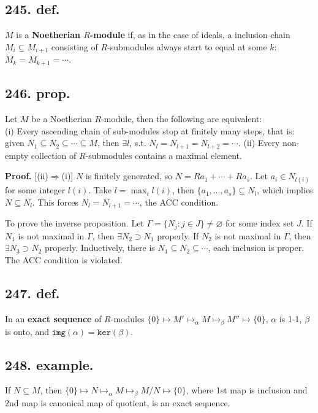 \documentclass[12pt]{article}
\newcommand\aG\alpha \newcommand\bG\beta  \newcommand\gG\gamma \newcommand\dG\delta \newcommand\eG\varepsilon \newcommand\zG\zeta \newcommand\tG\vartheta \newcommand\kG\kappa \newcommand\lG\lambda \newcommand\sG\sigma \newcommand\fG\varphi \newcommand\oG\omega
\newcommand\GG\varGamma \newcommand\DG\varDelta \newcommand\TG\Theta \newcommand\LG\varLambda \newcommand\SG\varSigma \newcommand\FG\varPhi \newcommand\YG\varUpsilon \newcommand\OG\varOmega
\newcommand{\Ex}\exists%
\newcommand{\Mp}\mapsto%
\newcommand{\Ip}{\Rightarrow} %
\newcommand{\Ss}[1]{\textsf{\bfseries{#1}}}%
\newcommand{\Tw}[1]{\texttt{#1}}%
\begin{document}
\subsection*{245. def.} \(M\) is a \Ss{Noetherian \(R\)-module} if, as in the case of ideals, a inclusion chain \(M_i \subseteq M_{i+1}\) consisting of \(R\)-submodules always start to equal at some \(k\): \(M_k =M_{k+1} =\dotsb\). 

\subsection*{246. prop.} Let \(M\) be a Noetherian \(R\)-module, then the following are equivalent: \\
\indent (i) Every ascending chain of sub-modules stop at finitely many steps, that is: given \(N_1 \subseteq N_2 \subseteq\dotsb\subseteq M\), then \(\Ex l\), s.t. \(N_l =N_{l+1} =N_{l+2}=\dotsb\). 
(ii) Every non-empty collection of \(R\)-submodules contains a maximal element. \par
\Ss{Proof.} [(ii)\(\Ip\)(i)] \(N\) is finitely generated, so \(N =Ra_1 +\dotsb+ Ra_s\). 
Let \(a_i \in N_{l(i)}\) for some integer \(l(i)\). 
Take \(l =\max_i l(i)\), then \(\{a_1,\dotsc,a_s\} \subseteq N_l\), which implies \(N \subseteq N_l\). 
This forces \(N_l =N_{l+1} =\dotsb\), the ACC condition. \par
[(i)\(\Ip\)(ii)] To prove the inverse proposition. 
Let \(\GG =\{N_j: j\in J\} \neq \varnothing\) for some index set \(J\). 
If \(N_1\) is not maximal in \(\GG\), then \(\Ex N_2 \supset N_1\) properly. 
If \(N_2\) is not maximal in \(\GG\), then \(\Ex N_3 \supset N_2\) properly. 
Inductively, there is \(N_1 \subseteq N_2 \subseteq\dotsb\), each inclusion is proper. 
The ACC condition is violated. 

\subsection*{247. def.} In an \Ss{exact sequence} of \(R\)-modules \(\{0\} \Mp M' \Mp_\aG M \Mp_\bG M'' \Mp \{0\}\), \(\aG\) is 1-1, \(\bG\) is onto, and \(\Tw{img}(\aG) =\Tw{ker}(\bG)\). 

\subsection*{248. example.} If \(N \subseteq M\), then \(\{0\} \Mp N \Mp_\aG M \Mp_\bG M/N \Mp \{0\}\), where 1st map is inclusion and 2nd map is canonical map of quotient, is an exact sequence. 
\end{document}
